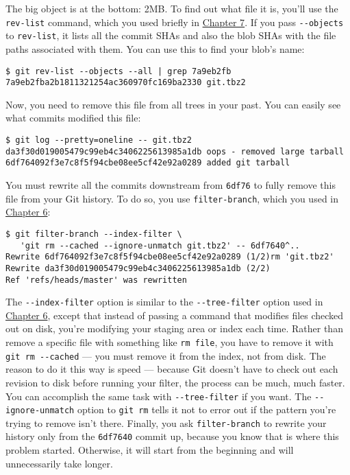 \documentclass[a4paper]{book}
\newcommand{\prechap}{Chapter }
\newcommand{\postchap}{}
\newcommand{\chapref}[1]{\hyperref[chap:#1]{\prechap #1\postchap}}
\begin{document}
The big object is at the bottom: 2MB. To find out what file it is, you'll use the \texttt{rev-list} command, which you used briefly in \chapref{7}. If you pass \texttt{-{}-objects} to \texttt{rev-list}, it lists all the commit SHAs and also the blob SHAs with the file paths associated with them. You can use this to find your blob's name:

\begin{shaded}\begin{verbatim}
$ git rev-list --objects --all | grep 7a9eb2fb
7a9eb2fba2b1811321254ac360970fc169ba2330 git.tbz2
\end{verbatim}\end{shaded}

Now, you need to remove this file from all trees in your past. You can easily see what commits modified this file:

\begin{shaded}\begin{verbatim}
$ git log --pretty=oneline -- git.tbz2
da3f30d019005479c99eb4c3406225613985a1db oops - removed large tarball
6df764092f3e7c8f5f94cbe08ee5cf42e92a0289 added git tarball
\end{verbatim}\end{shaded}

You must rewrite all the commits downstream from \texttt{6df76} to fully remove this file from your Git history. To do so, you use \texttt{filter-branch}, which you used in \chapref{6}:

\begin{shaded}\begin{verbatim}
$ git filter-branch --index-filter \
   'git rm --cached --ignore-unmatch git.tbz2' -- 6df7640^..
Rewrite 6df764092f3e7c8f5f94cbe08ee5cf42e92a0289 (1/2)rm 'git.tbz2'
Rewrite da3f30d019005479c99eb4c3406225613985a1db (2/2)
Ref 'refs/heads/master' was rewritten
\end{verbatim}\end{shaded}

The \texttt{-{}-index-filter} option is similar to the \texttt{-{}-tree-filter} option used in \chapref{6}, except that instead of passing a command that modifies files checked out on disk, you're modifying your staging area or index each time. Rather than remove a specific file with something like \texttt{rm file}, you have to remove it with \texttt{git rm -{}-cached} --- you must remove it from the index, not from disk. The reason to do it this way is speed --- because Git doesn't have to check out each revision to disk before running your filter, the process can be much, much faster. You can accomplish the same task with \texttt{-{}-tree-filter} if you want. The \texttt{-{}-ignore-unmatch} option to \texttt{git rm} tells it not to error out if the pattern you're trying to remove isn't there. Finally, you ask \texttt{filter-branch} to rewrite your history only from the \texttt{6df7640} commit up, because you know that is where this problem started. Otherwise, it will start from the beginning and will unnecessarily take longer.
\end{document}
